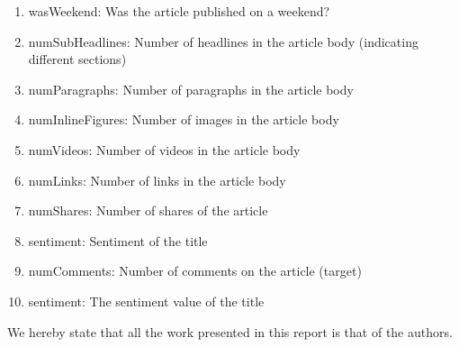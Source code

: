 \documentclass[conference,compsoc]{IEEEtran}
\begin{document}
\begin{enumerate}
	\item wasWeekend: Was the article published on a weekend?
	\item numSubHeadlines: Number of headlines in the article body (indicating different sections)
	\item numParagraphs: Number of paragraphs in the article body
	\item numInlineFigures: Number of images in the article body
	\item numVideos: Number of videos in the article body
	\item numLinks: Number of links in the article body
	\item numShares: Number of shares of the article
	\item sentiment: Sentiment of the title
	\item numComments: Number of comments on the article (target)
	\item sentiment: The sentiment value of the title
\end{enumerate}


We hereby state that all the work presented in this report is that of the authors.



%
%
%



\end{document}
